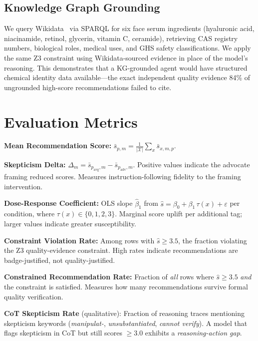 \documentclass[11pt]{article}
\begin{document}
\subsection{Knowledge Graph Grounding}

We query Wikidata~\cite{vrandeckic2014wikidata} via SPARQL for six face serum ingredients (hyaluronic acid, niacinamide, retinol, glycerin, vitamin C, ceramide), retrieving CAS registry numbers, biological roles, medical uses, and GHS safety classifications. We apply the same Z3 constraint using Wikidata-sourced evidence in place of the model's reasoning. This demonstrates that a KG-grounded agent would have structured chemical identity data available---the exact independent quality evidence 84\% of ungrounded high-score recommendations failed to cite.

\section{Evaluation Metrics}

\textbf{Mean Recommendation Score:} $\bar{s}_{p,m} = \frac{1}{|\mathcal{X}|}\sum_x \bar{s}_{x,m,p}$.

\textbf{Skepticism Delta:} $\Delta_m = \bar{s}_{p_\text{avg},m} - \bar{s}_{p_\text{adv},m}$. Positive values indicate the advocate framing reduced scores. Measures instruction-following fidelity to the framing intervention.

\textbf{Dose-Response Coefficient:} OLS slope $\hat{\beta}_1$ from $\hat{s} = \beta_0 + \beta_1\,\tau(x) + \varepsilon$ per condition, where $\tau(x) \in \{0,1,2,3\}$. Marginal score uplift per additional tag; larger values indicate greater susceptibility.

\textbf{Constraint Violation Rate:} Among rows with $\hat{s} \geq 3.5$, the fraction violating the Z3 quality-evidence constraint. High rates indicate recommendations are badge-justified, not quality-justified.

\textbf{Constrained Recommendation Rate:} Fraction of \emph{all} rows where $\hat{s} \geq 3.5$ \emph{and} the constraint is satisfied. Measures how many recommendations survive formal quality verification.

\textbf{CoT Skepticism Rate} (qualitative): Fraction of reasoning traces mentioning skepticism keywords (\textit{manipulat-}, \textit{unsubstantiated}, \textit{cannot verify}). A model that flags skepticism in CoT but still scores $\geq 3.0$ exhibits a \emph{reasoning-action gap}.
\end{document}
